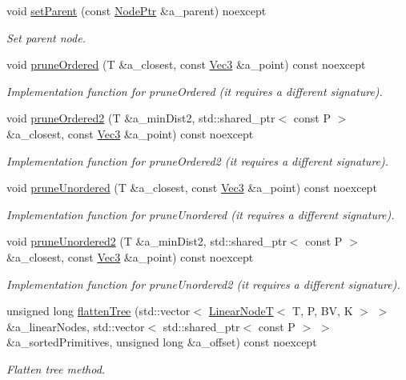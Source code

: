 \begin{DoxyCompactItemize}
void \hyperlink{classBVH_1_1NodeT_a92db0ab2d61c76469600478fddd04edc}{set\+Parent} (const \hyperlink{classBVH_1_1NodeT_a008f5c2c53adb1f5730d8478b48529b1}{Node\+Ptr} \&a\+\_\+parent) noexcept
\begin{DoxyCompactList}\small\item\em Set parent node. \end{DoxyCompactList}\item 
void \hyperlink{classBVH_1_1NodeT_ac4a3be457d66d2673f717f203e60fc08}{prune\+Ordered} (T \&a\+\_\+closest, const \hyperlink{classBVH_1_1NodeT_a6fbb4308c5c55ee170c5f992df7ae1d0}{Vec3} \&a\+\_\+point) const noexcept
\begin{DoxyCompactList}\small\item\em Implementation function for prune\+Ordered (it requires a different signature). \end{DoxyCompactList}\item 
void \hyperlink{classBVH_1_1NodeT_a2887ad51251739359602dde8db6a5998}{prune\+Ordered2} (T \&a\+\_\+min\+Dist2, std\+::shared\+\_\+ptr$<$ const P $>$ \&a\+\_\+closest, const \hyperlink{classBVH_1_1NodeT_a6fbb4308c5c55ee170c5f992df7ae1d0}{Vec3} \&a\+\_\+point) const noexcept
\begin{DoxyCompactList}\small\item\em Implementation function for prune\+Ordered2 (it requires a different signature). \end{DoxyCompactList}\item 
void \hyperlink{classBVH_1_1NodeT_ad252aa451ca983750dfa0c24344253b2}{prune\+Unordered} (T \&a\+\_\+closest, const \hyperlink{classBVH_1_1NodeT_a6fbb4308c5c55ee170c5f992df7ae1d0}{Vec3} \&a\+\_\+point) const noexcept
\begin{DoxyCompactList}\small\item\em Implementation function for prune\+Unordered (it requires a different signature). \end{DoxyCompactList}\item 
void \hyperlink{classBVH_1_1NodeT_a1079cba9ac1f114ad2cbc6cdea2eae49}{prune\+Unordered2} (T \&a\+\_\+min\+Dist2, std\+::shared\+\_\+ptr$<$ const P $>$ \&a\+\_\+closest, const \hyperlink{classBVH_1_1NodeT_a6fbb4308c5c55ee170c5f992df7ae1d0}{Vec3} \&a\+\_\+point) const noexcept
\begin{DoxyCompactList}\small\item\em Implementation function for prune\+Unordered2 (it requires a different signature). \end{DoxyCompactList}\item 
unsigned long \hyperlink{classBVH_1_1NodeT_a14f014426b00ad7989af328fa369bca8}{flatten\+Tree} (std\+::vector$<$ \hyperlink{classBVH_1_1LinearNodeT}{Linear\+NodeT}$<$ T, P, BV, K $>$ $>$ \&a\+\_\+linear\+Nodes, std\+::vector$<$ std\+::shared\+\_\+ptr$<$ const P $>$ $>$ \&a\+\_\+sorted\+Primitives, unsigned long \&a\+\_\+offset) const noexcept
\begin{DoxyCompactList}\small\item\em Flatten tree method. \end{DoxyCompactList}\end{DoxyCompactItemize}
